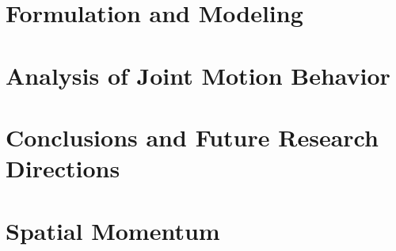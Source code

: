 \documentclass[12pt]{book}
\begin{document}
\chapter{Formulation and Modeling}
\label{cha:FORMULATION}


\chapter{Analysis of  Joint Motion Behavior}
\label{cha:JOINT}



\chapter{Conclusions and Future Research Directions}
\label{cha:CONCLUSION}



\acknowledgment
\label{cha:THNAK}


\label{cha:REF}


\result
\label{cha:RESULT}


\appendix
\chapter{Spatial Momentum}
\label{cha:SPATIAL}

\end{document}
